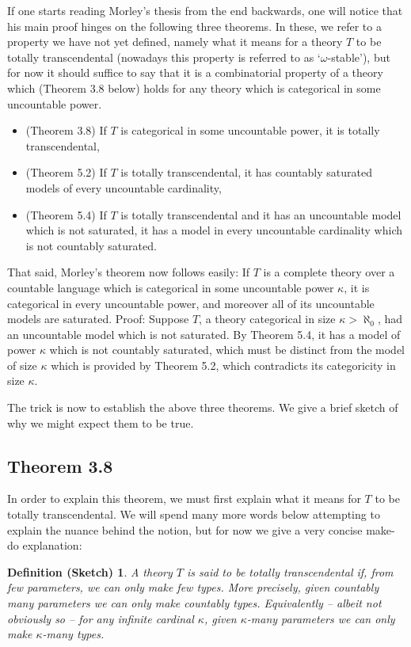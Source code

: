 \documentclass{article}
\newtheorem{defsketch}[theorem]{Definition (Sketch)}
\theoremstyle{nonumberplain}
\begin{document}
If one starts reading Morley's thesis from the end backwards, one will notice that his main proof hinges on the following three theorems. In these, we refer to a property we have not yet defined, namely what it means for a theory $T$ to be totally transcendental (nowadays this property is referred to as `$\omega$-stable'), but for now it should suffice to say that it is a combinatorial property of a theory which (Theorem 3.8 below) holds for any theory which is categorical in some uncountable power.

\begin{itemize}
\item (Theorem 3.8) If $T$ is categorical in some uncountable power, it is totally transcendental,
\item (Theorem 5.2) If $T$ is totally transcendental, it has countably saturated models of every uncountable cardinality,
\item (Theorem 5.4) If $T$ is totally transcendental and it has an uncountable model which is not saturated, it has a model in every uncountable cardinality which is not countably saturated.
\end{itemize}

That said, Morley's theorem now follows easily: If $T$ is a complete theory over a countable language which is categorical in some uncountable power $\kappa$, it is categorical in every uncountable power, and moreover all of its uncountable models are saturated. Proof: Suppose $T$, a theory categorical in size $\kappa > \aleph_0$, had an uncountable model which is not saturated. By Theorem 5.4, it has a model of power $\kappa$ which is not countably saturated, which must be distinct from the model of size $\kappa$ which is provided by Theorem 5.2, which contradicts its categoricity in size $\kappa$.

The trick is now to establish the above three theorems. We give a brief sketch of why we might expect them to be true.

\subsection{Theorem 3.8}

In order to explain this theorem, we must first explain what it means for $T$ to be totally transcendental. We will spend many more words below attempting to explain the nuance behind the notion, but for now we give a very concise make-do explanation:
\begin{defsketch}\label{defsketch:tt}
A theory $T$ is said to be totally transcendental if, from few parameters, we can only make few types. More precisely, given countably many parameters we can only make countably types. Equivalently -- albeit not obviously so -- for any infinite cardinal $\kappa$, given $\kappa$-many parameters we can only make $\kappa$-many types.
\end{defsketch}
\end{document}
